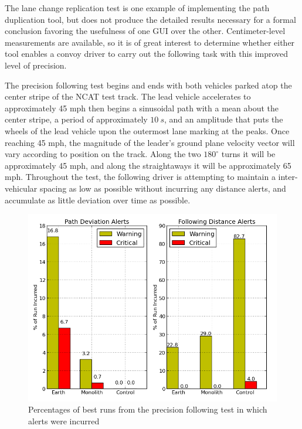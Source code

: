 \documentclass[twocolumn,10pt]{article}
\begin{document}
    The lane change replication test is one example of implementing the path duplication tool, but does not produce the detailed results necessary for a formal conclusion favoring the usefulness of one GUI over the other.  Centimeter-level measurements are available, so it is of great interest to determine whether either tool enables a convoy driver to carry out the following task with this improved level of precision.
    
    The precision following test begins and ends with both vehicles parked atop the center stripe of the NCAT test track.  The lead vehicle accelerates to approximately 45 mph then begins a sinusoidal path with a mean about the center stripe, a period of approximately $10~s$, and an amplitude that puts the wheels of the lead vehicle upon the outermost lane marking at the peaks.  Once reaching 45 mph, the magnitude of the leader’s ground plane velocity vector will vary according to position on the track.  Along the two $180^{\circ}$ turns it will be approximately 45 mph, and along the straightaways it will be approximately 65 mph.  Throughout the test, the following driver is attempting to maintain a inter-vehicular spacing as low as possible without incurring any distance alerts, and accumulate as little deviation over time as possible.
    
    \begin{figure}[ht] \centering
      \includegraphics[width=\columnwidth]{../graphics/precision_following_alert_percents.png}
      \caption{Percentages of best runs from the precision following test in which alerts were incurred}
      \label{fig:precision_following_alert_percents}
    \end{figure}
\end{document}
